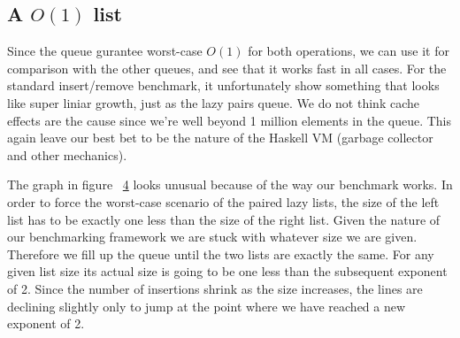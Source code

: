 \subsection*{A $O(1)$ list}
Since the queue gurantee worst-case $O(1)$ for both operations, we can use it for comparison with the other queues, and see that it works fast in all cases. For the standard insert/remove benchmark, it unfortunately show something that looks like super liniar growth, just as the lazy pairs queue. We do not think cache effects are the cause since we're well beyond 1 million elements in the queue. This again leave our best bet to be the nature of the Haskell VM (garbage collector and other mechanics).


\begin{figure}[htb]
\centering

\label{fig:simple}
\end{figure}

\begin{figure}[htb]
\centering

\label{fig:simple-high}
\end{figure}


\begin{figure}[htb]
\centering

\label{fig:reuse-remove-2}
\end{figure}

The graph in figure ~\ref{fig:reuse-remove-4} looks unusual because of the way our benchmark works. In order to force the worst-case scenario of the paired lazy lists, the size of the left list has to be exactly one less than the size of the right list. Given the nature of our benchmarking framework we are stuck with whatever size we are given. Therefore we fill up the queue until the two lists are exactly the same. For any given list size its actual size is going to be one less than the subsequent exponent of 2. Since the number of insertions shrink as the size increases, the lines are declining slightly only to jump at the point where we have reached a new exponent of 2.


\begin{figure}[htb]
\centering

\label{fig:reuse-remove-4}
\end{figure}


